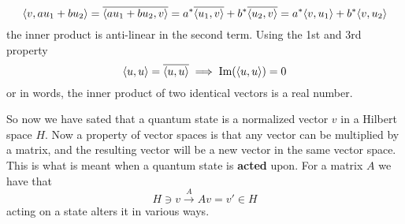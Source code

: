 \begin{equation}
\langle v,au_1 + bu_2 \rangle = \overline{\langle au_1 + bu_2,v \rangle} = a^{*}\overline{\langle u_1,v \rangle} + b^{*}\overline{\langle u_2,v \rangle} =   a^{*}\langle v,u_1 \rangle + b^{*}\langle v,u_2 \rangle
\end{equation} 
the inner product is anti-linear in the second term.
Using the 1st and 3rd property 
\begin{equation}
\langle u,u \rangle = \overline{\langle u,u \rangle} \implies \text{Im}(\langle u,u \rangle) = 0
\end{equation}
or in words, the inner product of two identical vectors is a real number.

So now we have sated that a quantum state is a normalized vector $v$ in a Hilbert space $H$. Now a property of vector spaces is that any vector can be multiplied by a matrix, and the resulting vector will be a new vector in the same vector space. This is what is meant when a quantum state is \textbf{acted} upon. For a matrix $A$ we have that 
\begin{equation}
H \ni v  \xrightarrow{A} Av = v' \in H
\end{equation}
acting on a state alters it in various ways.

